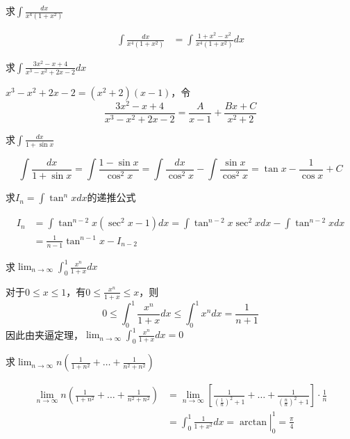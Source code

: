 \documentclass{article}
\begin{document}
\begin{examplle}[]
求\(\displaystyle\int\frac{dx}{x^4(1+x^2)}\)

\begin{align*}
\int\frac{dx}{x^4(1+x^2)}&=
\int\frac{1+x^2-x^2}{x^4(1+x^2)}dx
\end{align*}
\end{examplle}

\begin{examplle}[]
求\(\displaystyle\int\frac{3x^2-x+4}{x^3-x^2+2x-2}dx\)

\(x^3-x^2+2x-2=(x^2+2)(x-1)\)，令
\begin{equation*}
\frac{3x^2-x+4}{x^3-x^2+2x-2}=
\frac{A}{x-1}+\frac{Bx+C}{x^2+2}
\end{equation*}
\end{examplle}

\begin{examplle}[]
求\(\displaystyle\int\frac{dx}{1+\sin x}\)

\begin{equation*}
\int\frac{dx}{1+\sin x}=\int\frac{1-\sin x}{\cos^2 x}=
\int\frac{dx}{\cos^2x}-\int\frac{\sin x}{\cos^2 x}=\tan x-\frac{1}{\cos x}+C
\end{equation*}
\end{examplle}

\begin{examplle}[]
求\(I_n=\int\tan^nxdx\)的递推公式

\begin{align*}
I_n&=\int\tan^{n-2}x(\sec^2x-1)dx=\int\tan^{n-2}x\sec^2 xdx-\int\tan^{n-2}xdx\\
&=\frac{1}{n-1}\tan^{n-1}x-I_{n-2}
\end{align*}
\end{examplle}

\begin{examplle}[]
求\(\displaystyle\lim_{n\to\infty}\int_0^1\frac{x^n}{1+x}dx\)

对于\(0\le x\le1\)，有\(0\le\frac{x^n}{1+x}\le x\)，则
\begin{equation*}
0\le\int_0^1\frac{x^n}{1+x}dx\le\int^1_0x^ndx=\frac{1}{n+1}
\end{equation*}
因此由夹逼定理，\(\displaystyle\lim_{n\to\infty}\int_0^1\frac{x^n}{1+x}dx=0\)
\end{examplle}

\begin{examplle}[]
求\(\displaystyle\lim_{n\to\infty}n(\frac{1}{1+n^2}+\dots+\frac{1}{n^2+n^2})\)

\begin{align*}
\lim_{n\to\infty}n(\frac{1}{1+n^2}+\dots+\frac{1}{n^2+n^2})&=
\lim_{n\to\infty}\left[
\frac{1}{(\frac{1}{n})^2+1}+\dots+\frac{1}{(\frac{n}{n})^2+1}
\right]\cdot\frac{1}{n}\\
&=\left.\int_0^1\frac{1}{1+x^2}dx=\arctan\right\rvert_0^1=\frac{\pi}{4}
\end{align*}
\end{examplle}
\end{document}
